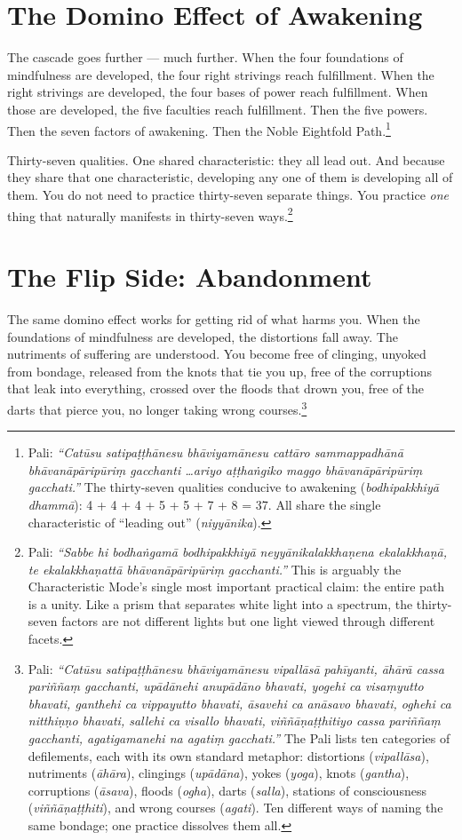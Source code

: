 \section*{The Domino Effect of Awakening}

The cascade goes further --- much further. When the four foundations of mindfulness are developed, the four right strivings reach fulfillment. When the right strivings are developed, the four bases of power reach fulfillment. When those are developed, the five faculties reach fulfillment. Then the five powers. Then the seven factors of awakening. Then the Noble Eightfold Path.\footnote{Pali: \textit{``Catūsu satipaṭṭhānesu bhāviyamānesu cattāro sammappadhānā bhāvanāpāripūriṃ gacchanti \ldots ariyo aṭṭhaṅgiko maggo bhāvanāpāripūriṃ gacchati.''} The thirty-seven qualities conducive to awakening (\textit{bodhipakkhiyā dhammā}): 4 + 4 + 4 + 5 + 5 + 7 + 8 = 37. All share the single characteristic of ``leading out'' (\textit{niyyānika}).}

Thirty-seven qualities. One shared characteristic: they all lead out. And because they share that one characteristic, developing any one of them is developing all of them. You do not need to practice thirty-seven separate things. You practice \textit{one} thing that naturally manifests in thirty-seven ways.\footnote{Pali: \textit{``Sabbe hi bodhaṅgamā bodhipakkhiyā neyyānikalakkhaṇena ekalakkhaṇā, te ekalakkhaṇattā bhāvanāpāripūriṃ gacchanti.''} This is arguably the Characteristic Mode's single most important practical claim: the entire path is a unity. Like a prism that separates white light into a spectrum, the thirty-seven factors are not different lights but one light viewed through different facets.}

\section*{The Flip Side: Abandonment}

The same domino effect works for getting rid of what harms you. When the foundations of mindfulness are developed, the distortions fall away. The nutriments of suffering are understood. You become free of clinging, unyoked from bondage, released from the knots that tie you up, free of the corruptions that leak into everything, crossed over the floods that drown you, free of the darts that pierce you, no longer taking wrong courses.\footnote{Pali: \textit{``Catūsu satipaṭṭhānesu bhāviyamānesu vipallāsā pahīyanti, āhārā cassa pariññaṃ gacchanti, upādānehi anupādāno bhavati, yogehi ca visaṃyutto bhavati, ganthehi ca vippayutto bhavati, āsavehi ca anāsavo bhavati, oghehi ca nitthiṇṇo bhavati, sallehi ca visallo bhavati, viññāṇaṭṭhitiyo cassa pariññaṃ gacchanti, agatigamanehi na agatiṃ gacchati.''} The Pali lists ten categories of defilements, each with its own standard metaphor: distortions (\textit{vipallāsa}), nutriments (\textit{āhāra}), clingings (\textit{upādāna}), yokes (\textit{yoga}), knots (\textit{gantha}), corruptions (\textit{āsava}), floods (\textit{ogha}), darts (\textit{salla}), stations of consciousness (\textit{viññāṇaṭṭhiti}), and wrong courses (\textit{agati}). Ten different ways of naming the same bondage; one practice dissolves them all.}

